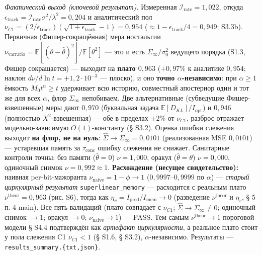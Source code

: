 \documentclass[12pt]{iopart}
\begin{document}
\emph{Фактический выход (ключевой результат).} Измеренная \(\mathcal I_{\text{rate}} = 1{,}022\), откуда \(\epsilon_{\text{track}} = \mathcal I_{\text{rate}}\sigma^2/\lambda^2 = 0{,}204\) и аналитический пол \(\nu_{C1} = (2/\epsilon_{\text{track}})(\sqrt{1+\epsilon_{\text{track}}}-1) = 0{,}954\) (\(\approx 1-\epsilon_{\text{track}}/4 = 0{,}949\); S3.3b). Первичная (Фишер-сокращённая) мера ностальгии \(\nu_{\text{varratio}} = \mathbb{E}[(\theta-\hat\theta)^2]/\mathbb{E}[\theta^2]\) --- это и есть \(\Sigma_\infty/\sigma_0^2\) ведущего порядка (S1.3, Фишер сокращается) --- выходит на \textbf{плато \(0{,}963\)} (\(+0{,}97\%\) к аналитике \(0{,}954\); наклон \(d\nu/d\ln t = +1{,}2\cdot10^{-3}\) --- плоско), и оно \textbf{точно \(\alpha\)-независимо}: при \(\alpha \ge 1\) ёмкость \(M_0 t^\alpha \ge t\) удерживает всю историю, совместный апостериор один и тот же для всех \(\alpha\), флор \(\Sigma_\infty\) непобиваем. Две альтернативные (субведущие Фишер-взвешенные) меры дают \(0{,}970\) (буквальная задача \(\mathbb{E}[D_{KL}]/I_{\text{opt}}\)) и \(0{,}946\) (полностью \(X^2\)-взвешенная) --- обе в пределах \(\pm2\%\) от \(\nu_{C1}\), разброс отражает модельно-зависимую \(O(1)\)-константу (§ S3.2). Оценка ошибки слежения выходит \textbf{на флор, не на нуль}: \(\hat\Sigma \to \Sigma_\infty = 0{,}0101\) (реализованная MSE \(0{,}0101\)) --- устаревшая память за \(\tau_{\text{conc}}\) ошибку слежения не снижает. Санитарные контроли точны: без памяти (\(\hat\theta = 0\)) \(\nu = 1{,}000\), оракул (\(\hat\theta = \theta\)) \(\nu = 0{,}000\), одиночный снимок \(\nu = 0{,}992\approx1\). \textbf{Расхождение (несущее свидетельство):} наивная per-bit-мажоранта \(\nu_{\text{naive}} = 1-\phi \to 1\) (\(0{,}9997\)--\(0{,}9999\) по \(\alpha\)) --- \emph{старый циркулярный результат} \texttt{superlinear\_memory} --- расходится с реальным плато \(\nu^{\text{theor}} = 0{,}963\) (рис. S6), тогда как \(\eta_v = I_{\text{pred}}/I_{\text{mem}} \to 0\) (разведение \(\nu^{\text{theor}}\) и \(\eta_v\), § 5 п. 4 main). Все пять валидаций (плато совпадает с \(\nu_{C1}\); \(\hat\Sigma\to\Sigma_\infty\neq0\); одиночный снимок \(\to1\); оракул \(\to0\); \(\nu_{\text{naive}}\to1\)) --- PASS. Тем самым \(\nu^{\text{theor}}\to1\) пороговой модели § S4.4 подтверждён как \emph{артефакт циркулярности}, а реальное плато стоит у пола слежения C1 \(\nu_{C1}<1\) (§ S1.6, § S3.2), \(\alpha\)-независимо. Результаты --- \texttt{results\_summary.\{txt,json\}}.
\end{document}
